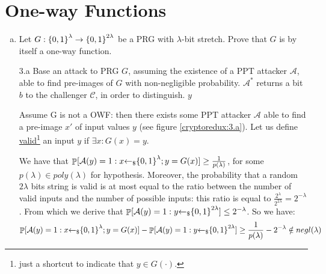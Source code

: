 \section{One-way Functions}
\begin{enumerate}[(a)]
	\item Let $G: {\{0, 1\}}^\lambda \to {\{0, 1\}}^{2\lambda}$ be a PRG with $\lambda$-bit stretch. Prove that $G$ is by itself a one-way function.

	      \begin{solution}
		      \begin{cryptoredux}
			      {3.a}
			      {Base an attack to PRG $G$, assuming the existence of a PPT attacker $\mathcal{A}$, able to find pre-images of $G$ with non-negligible probability. $\mathcal{A}^*$ returns a bit $b$ to the challenger $\mathcal{C}$, in order to distinguish.}
			      {}
			      {}
			      {}
			      {$y$}{}
			      \cseqdelay
		      \end{cryptoredux}
		      Assume G is not a OWF: then there exists some PPT attacker $\mathcal{A}$ able to find a pre-image $x'$ of input values $y$ (see figure \ref{cryptoredux:3.a}).
		      Let us define \underline{valid}\footnote{just a shortcut to indicate that $y \in G(\cdot)$.} an input $y$ if $\exists x: G(x) = y$.

		      We have that $\mathop{\mathbb P}[\mathcal{A}(y) = 1: x {\leftarrow_\$} {\{0, 1\}}^\lambda; y = G(x)] \ge \frac{1}{p(\lambda)}$, for some $p(\lambda) \in poly(\lambda)$ for hypothesis.
		      Moreover, the probability that a random $2\lambda$ bits string is valid is at most equal to the ratio between the number of valid inputs and the number of possible inputs: this ratio is equal to $\frac{2^\lambda}{2^{2\lambda}} = 2^{-\lambda}$.
		      From which we derive that $\mathop{\mathbb P}[\mathcal{A}(y) = 1: y {\leftarrow_\$} {\{0, 1\}}^{2\lambda}] \le 2^{-\lambda}$.
		      So we have:
		      \[\mathop{\mathbb P}[\mathcal{A}(y) = 1: x {\leftarrow_\$} {\{0, 1\}}^\lambda; y = G(x)] - \mathop{\mathbb P}[\mathcal{A}(y) = 1: y {\leftarrow_\$} {\{0, 1\}}^{2\lambda}] \ge \frac{1}{p(\lambda)} - 2^{-\lambda} \notin negl(\lambda) \]
	      \end{solution}


\end{enumerate}
